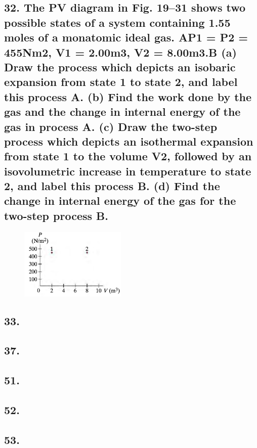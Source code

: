 \documentclass{article}
\begin{document}
    \subsection*{32. The PV diagram in Fig. 19–31 shows two possible states of a system containing 1.55 moles of a monatomic ideal gas. AP1 = P2 = 455Nm2, V1 = 2.00m3, V2 = 8.00m3.B (a) Draw the process which depicts an isobaric expansion from state 1 to state 2, and label this process A. (b) Find the work done by the gas and the change in internal energy of the gas in process A. (c) Draw the two-step process which depicts an isothermal expansion from state 1 to the volume V2, followed by an isovolumetric increase in temperature to
    state 2, and label this process B. (d) Find the change in internal energy of the gas for the two-step process B.}
    \begin{figure}[h]
        \includegraphics[width=0.45\textwidth]{figures/fig19-31.jpg}
    \end{figure}
    \vspace{4in}
    \subsection*{33. }
    \vspace{4in}
    \subsection*{37. }
    \vspace{4in}
    \subsection*{51. }
    \vspace{4in}
    \subsection*{52. }
    \vspace{4in}
    \subsection*{53. }
    \vspace{4in}
\end{document}

